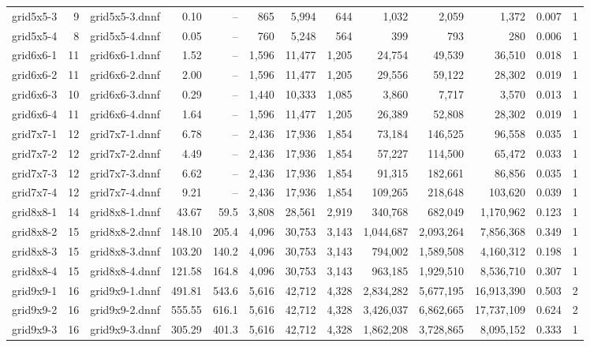 \documentclass[10pt]{article}
\begin{document}
\begin{lrbox}{\tbl}
\begin{tabular}{lrlrrrrrrrrrr}
grid5x5-3 & 9 & grid5x5-3.dnnf & 0.10 & -- & 865 & 5,994 & 644 & 1,032 & 2,059 & 1,372 & 0.007 & 1 \\
grid5x5-4 & 8 & grid5x5-4.dnnf & 0.05 & -- & 760 & 5,248 & 564 & 399 & 793 & 280 & 0.006 & 1 \\
grid6x6-1 & 11 & grid6x6-1.dnnf & 1.52 & -- & 1,596 & 11,477 & 1,205 & 24,754 & 49,539 & 36,510 & 0.018 & 1 \\
grid6x6-2 & 11 & grid6x6-2.dnnf & 2.00 & -- & 1,596 & 11,477 & 1,205 & 29,556 & 59,122 & 28,302 & 0.019 & 1 \\
grid6x6-3 & 10 & grid6x6-3.dnnf & 0.29 & -- & 1,440 & 10,333 & 1,085 & 3,860 & 7,717 & 3,570 & 0.013 & 1 \\
grid6x6-4 & 11 & grid6x6-4.dnnf & 1.64 & -- & 1,596 & 11,477 & 1,205 & 26,389 & 52,808 & 28,302 & 0.019 & 1 \\
grid7x7-1 & 12 & grid7x7-1.dnnf & 6.78 & -- & 2,436 & 17,936 & 1,854 & 73,184 & 146,525 & 96,558 & 0.035 & 1 \\
grid7x7-2 & 12 & grid7x7-2.dnnf & 4.49 & -- & 2,436 & 17,936 & 1,854 & 57,227 & 114,500 & 65,472 & 0.033 & 1 \\
grid7x7-3 & 12 & grid7x7-3.dnnf & 6.62 & -- & 2,436 & 17,936 & 1,854 & 91,315 & 182,661 & 86,856 & 0.035 & 1 \\
grid7x7-4 & 12 & grid7x7-4.dnnf & 9.21 & -- & 2,436 & 17,936 & 1,854 & 109,265 & 218,648 & 103,620 & 0.039 & 1 \\
grid8x8-1 & 14 & grid8x8-1.dnnf & 43.67 & 59.5 & 3,808 & 28,561 & 2,919 & 340,768 & 682,049 & 1,170,962 & 0.123 & 1 \\
grid8x8-2 & 15 & grid8x8-2.dnnf & 148.10 & 205.4 & 4,096 & 30,753 & 3,143 & 1,044,687 & 2,093,264 & 7,856,368 & 0.349 & 1 \\
grid8x8-3 & 15 & grid8x8-3.dnnf & 103.20 & 140.2 & 4,096 & 30,753 & 3,143 & 794,002 & 1,589,508 & 4,160,312 & 0.198 & 1 \\
grid8x8-4 & 15 & grid8x8-4.dnnf & 121.58 & 164.8 & 4,096 & 30,753 & 3,143 & 963,185 & 1,929,510 & 8,536,710 & 0.307 & 1 \\
grid9x9-1 & 16 & grid9x9-1.dnnf & 491.81 & 543.6 & 5,616 & 42,712 & 4,328 & 2,834,282 & 5,677,195 & 16,913,390 & 0.503 & 2 \\
grid9x9-2 & 16 & grid9x9-2.dnnf & 555.55 & 616.1 & 5,616 & 42,712 & 4,328 & 3,426,037 & 6,862,665 & 17,737,109 & 0.624 & 2 \\
grid9x9-3 & 16 & grid9x9-3.dnnf & 305.29 & 401.3 & 5,616 & 42,712 & 4,328 & 1,862,208 & 3,728,865 & 8,095,152 & 0.333 & 1 \\

\end{tabular}
\end{lrbox}
\end{document}
